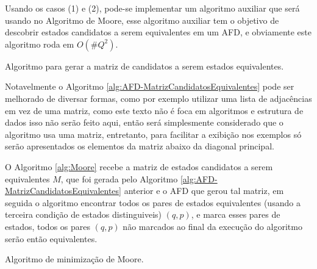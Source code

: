 Usando os casos (1) e (2), pode-se implementar um algoritmo auxiliar que será usando no Algoritmo de Moore, esse algoritmo auxiliar tem o objetivo de descobrir estados candidatos a serem equivalentes em um AFD, e obviamente este algoritmo roda em $O(\#Q^2)$.

\begin{algorithm}[H]
	\caption{Algoritmo para gerar a matriz de candidatos a serem estados equivalentes.}
	\label{alg:AFD-MatrizCandidatosEquivalentes}
\end{algorithm}

Notavelmente o Algoritmo \ref{alg:AFD-MatrizCandidatosEquivalentes} pode ser melhorado de diversar formas, como por exemplo utilizar uma lista de adjacências em vez de uma matriz, como este texto não é foca em algoritmos e estrutura de dados isso não serão feito aqui, então será simplesmente considerado que o algoritmo usa uma matriz, entretanto, para facilitar a exibição nos exemplos só serão apresentados os elementos da matriz abaixo da diagonal principal.

O Algoritmo \ref{alg:Moore} recebe a matriz de estados candidatos a serem equivalentes $M$, que foi gerada pelo Algoritmo \ref{alg:AFD-MatrizCandidatosEquivalentes} anterior e o AFD que gerou tal matriz, em seguida o algoritmo encontrar todos os pares de estados equivalentes (usando a terceira condição de estados distinguiveis) $(q, p)$, e marca esses pares de estados, todos os pares $(q, p)$ não marcados ao final da execução do algoritmo serão então equivalentes.

\begin{algorithm}[H]
	\caption{Algoritmo de minimização de Moore.}
	\label{alg:Moore}
\end{algorithm}

